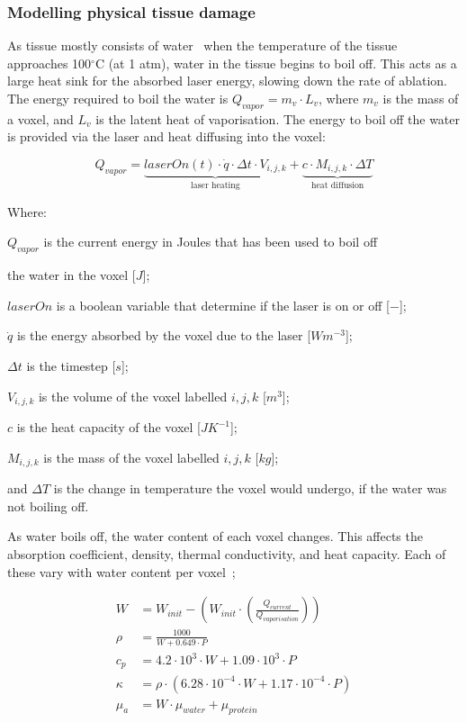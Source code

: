 \subsubsection*{Modelling physical tissue damage}

As tissue mostly consists of water~\cite{meglinski2002quantitative} when the temperature of the tissue approaches 100$^{\circ}$C (at 1 atm), water in the tissue begins to boil off. This acts as a large heat sink for the absorbed laser energy, slowing down the rate of ablation. The energy required to boil the water is $Q_{vapor}=m_v\cdot L_v$, where $m_v$ is the mass of a voxel, and $L_v$ is the latent heat of vaporisation. The energy to boil off the water is provided via the laser and heat diffusing into the voxel:

\begin{equation}
Q_{vapor}=\underbrace{laserOn(t)\cdot\dot{q}\cdot \Delta t\cdot V_{i,j,k}}_\text{laser heating} + \underbrace{c\cdot M_{i,j,k}\cdot\Delta T}_\text{heat diffusion}
\end{equation}

\noindent Where:

	\indent $Q_{vapor}$ is the current energy in Joules that has been used to boil off

	\indent the water in the voxel [$J$];
	
	\indent $laserOn$ is a boolean variable that determine if the laser is on or off [$-$];
	
	\indent $\dot{q}$ is the energy absorbed by the voxel due to the laser [$W m^{-3}$];
	
	\indent $\Delta t$ is the timestep [$s$];
	
	\indent $V_{i,j,k}$ is the volume of the voxel labelled $i,j,k$ [$m^3$];
	
	\indent $c$ is the heat capacity of the voxel [$J K^{-1}$];
	
	\indent $M_{i,j,k}$ is the mass of the voxel labelled $i,j,k$ [$kg$];
	
	\indent and $\Delta T$ is the change in temperature the voxel would undergo, if the water was not boiling off.

	\medskip
	
As water boils off, the water content of each voxel changes. This affects the absorption coefficient, density, thermal conductivity, and heat capacity. Each of these vary with water content per voxel~\cite{loiola2018thermal};

\begin{align}
W &= W_{init} - \left(W_{init} \cdot \left(\tfrac{Q_{current}}{Q_{vaporisation}}\right)\right) \\
\rho &= \frac{1000}{W + 0.649\cdot P} \\
c_p &= 4.2\cdot 10^{3}\cdot W + 1.09\cdot 10^{3}\cdot P \\
\kappa &= \rho \cdot (6.28\cdot 10^{-4}\cdot W + 1.17\cdot 10^{-4} \cdot P)\\
\mu_a &= W \cdot \mu_{water} + \mu_{protein}\\
\end{align}

